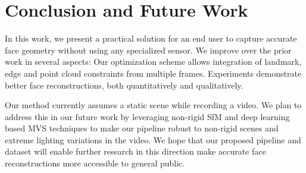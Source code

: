 \documentclass[10pt,twocolumn,letterpaper]{article}
\begin{document}
\section{Conclusion and Future Work}
In this work, we present a practical solution for an end user to capture accurate face geometry without using any specialized sensor. We improve over the prior work in several aspects: Our optimization scheme allows integration of landmark, edge and point cloud constraints from multiple frames. Experiments demonstrate better face reconstructions, both quantitatively and qualitatively. 

Our method currently assumes a static scene while recording a video. We plan to address this in our future work by leveraging non-rigid SfM and deep learning based MVS techniques to make our pipeline robust to non-rigid scenes and extreme lighting variations in the video. We hope that our proposed pipeline and dataset will enable further research in this direction make accurate face reconstructions more accessible to general public.    

\newpage
\newpage
{\small


}
\end{document}
